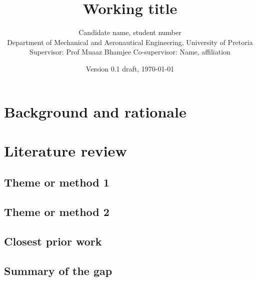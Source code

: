 \documentclass[11pt,a4paper]{article}
\title{Working title}
\author{Candidate name, student number\\
Department of Mechanical and Aeronautical Engineering, University of Pretoria\\[1ex]
\small Supervisor: Prof Muaaz Bhamjee \quad Co-supervisor: Name, affiliation}
\date{Version 0.1 draft, \today}
\begin{document}
\maketitle

\begin{abstract}
\end{abstract}

\printnomenclature

\section{Background and rationale}

\section{Literature review}
\subsection{Theme or method 1}
\subsection{Theme or method 2}
\subsection{Closest prior work}
\subsection{Summary of the gap}
\end{document}
